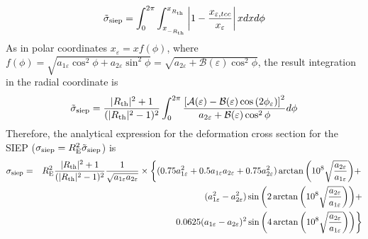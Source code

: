 \begin{equation}
\tilde{\sigma}_{\rm siep}= \int_{0}^{2\pi}\int_{x_{_{-R_{\rm th}}}}^{x_{_{R_{\rm th}}}}\left| 1-\dfrac{x_{\varepsilon,tcc}}{x_{\varepsilon}}\right| x dx d\phi 
\end{equation}
As in polar coordinates $x_{\varepsilon}=xf(\phi)$, where $f(\phi)=\sqrt{a_{1\varepsilon}\cos^2{\phi}+a_{2\varepsilon}\sin^2{\phi}}=\sqrt{a_{2\varepsilon}+\mathcal{B}(\varepsilon)\cos^2{\phi}}$, the result integration in the radial coordinate is
\begin{equation}
\tilde{\sigma}_{\rm siep}= \dfrac{|R_{\rm th}|^2+1}{(|R_{\rm th}|^2-1)^2}
\int_{0}^{2\pi}\dfrac{\left[\mathcal{A}(\varepsilon)-\mathcal{B}(\varepsilon)\cos{
(2\phi_\varepsilon)} \right]^2}{a_{2\varepsilon}+\mathcal{B}(\varepsilon)\cos^2{\phi}} d\phi 
\end{equation}
Therefore, the analytical expression for the deformation cross section for the SIEP ($\sigma_{\rm siep}=R^2_{\rm E}\tilde{\sigma}_{\rm siep}$) is
\begin{eqnarray}
\sigma_{\rm siep}&=& R^2_{\rm E}\dfrac{|R_{\rm th}|^2+1}{(|R_{\rm th}|^2-1)^2}\dfrac{1}{\sqrt{a_{1\varepsilon} a_{2\varepsilon}}}\times \left\{(0.75a^2_{1\varepsilon}+0.5 a_{1\varepsilon}a_{2\varepsilon}+0.75 a^2_{2\varepsilon})\arctan{\left(10^{8}\sqrt{\frac{a_{2\varepsilon}}{a_{1\varepsilon}}} \right)} + \right. \nonumber \\
& & (a^2_{1\varepsilon}-a^ 2_{2\varepsilon})\sin{\left(2\arctan{\left( 10^{8}\sqrt{\frac{a_{2\varepsilon}}{a_{1\varepsilon}}}\right)}\right)} + \\
 & & \left. 0.0625(a_{1\varepsilon}-a_{2\varepsilon})^2\sin{\left(4\arctan{\left(10^{8}\sqrt{\frac{a_{2\varepsilon}}{a_{1\varepsilon}}} \right)}\right)}\right\}  \nonumber 
\end{eqnarray}




